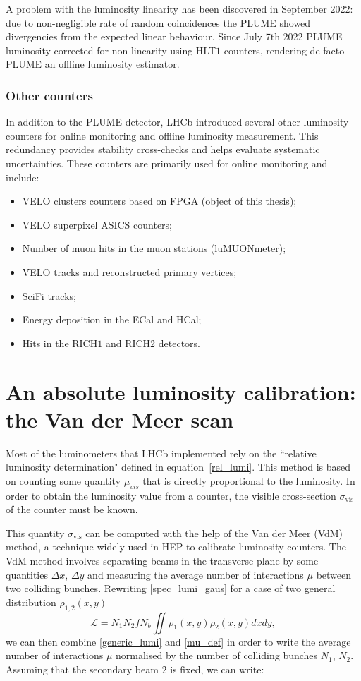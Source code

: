 A problem with the luminosity linearity has been discovered in September 2022: due to non-negligible rate of random coincidences the PLUME showed divergencies from the expected linear behaviour. Since July 7th 2022 PLUME luminosity corrected for non-linearity using HLT$1$ counters, rendering de-facto PLUME an offline luminosity estimator.


\subsubsection{Other counters} 
In addition to the PLUME detector, LHCb introduced several other luminosity counters for online monitoring and offline luminosity measurement. This redundancy provides stability cross-checks and helps evaluate systematic uncertainties.
These counters are primarily used for online monitoring and include:
\begin{itemize}
   \item VELO clusters counters based on FPGA (object of this thesis);
   \item VELO superpixel ASICS counters;
   \item Number of muon hits in the muon stations (luMUONmeter);
   \item VELO tracks and reconstructed primary vertices;
   \item SciFi tracks;
   \item Energy deposition in the ECal and HCal;
    \item Hits in the RICH$1$ and RICH$2$ detectors.
\end{itemize}


\section{An absolute luminosity calibration: the Van der Meer scan}
Most of the luminometers that LHCb implemented rely on the ``relative luminosity determination" defined in equation~\eqref{rel_lumi}. This method is based on counting some quantity $\mu_{vis}$ that is directly proportional to the luminosity. In order to obtain the luminosity value from a counter, the visible cross-section $\sigma_{\text{vis}}$ of the counter must be known. 

This quantity $\sigma_{\text{vis}}$ can be computed with the help of the Van der Meer (VdM) method, a technique widely used in HEP to calibrate luminosity counters. The VdM method involves separating beams in the transverse plane by some quantities $\Delta x$, $\Delta y$ and measuring the average number of interactions $\mu$ between two colliding bunches. 
Rewriting \eqref{spec_lumi_gaus} for a case of two general distribution $\rho_{1,2} (x,y)$
\begin{equation}
    \mathcal{L} = N_1 N_2 f N_b\iint \rho_1(x,y) \rho_2(x,y) dxdy,\label{generic_lumi}
\end{equation}
we can then combine \eqref{generic_lumi} and \eqref{mu_def} in order to write the average number of interactions $\mu$ normalised by the number of colliding bunches $N_1$, $N_2$. Assuming that the secondary beam $2$ is fixed, we can write:

